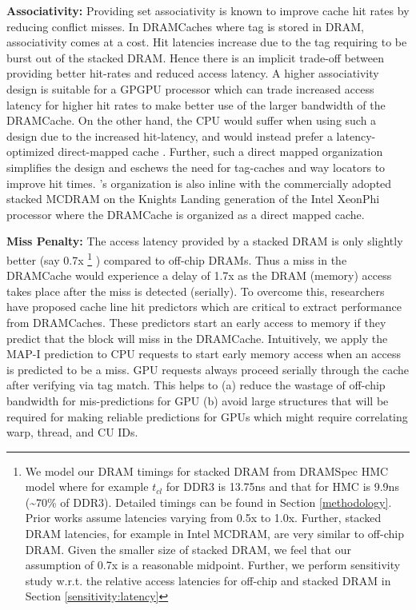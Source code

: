 \par \textbf{Associativity:} Providing set associativity is known to improve cache hit rates by reducing conflict misses. In DRAMCaches where tag is stored in DRAM,  associativity comes at a cost. Hit latencies increase due to the tag requiring to be burst out of the stacked DRAM. Hence there is an implicit trade-off between providing better hit-rates and reduced access latency. A higher associativity design is suitable for a GPGPU processor which can trade increased access latency for higher hit rates to make better use of the larger bandwidth of the DRAMCache. On the other hand, the CPU would suffer when using such a design due to the increased hit-latency, and  would instead prefer a latency-optimized direct-mapped cache \cite{alloy}.
Further, such a direct mapped organization simplifies the design and eschews the need for tag-caches \cite{atcache} and way locators \cite{bimodal} to improve hit times. \cachename's organization is also inline with the commercially adopted stacked MCDRAM on the Knights Landing generation of the Intel XeonPhi processor \cite{xeonphi} where the DRAMCache is organized as a direct mapped cache.

\par \textbf{Miss Penalty:} The access latency provided by a stacked DRAM is only slightly better (say 0.7x
\footnote{We model our DRAM timings for stacked DRAM from DRAMSpec\cite{dramspec} HMC model where for example $t_{cl}$ for DDR3 is 13.75ns and that for HMC is 9.9ns (\textasciitilde70\% of DDR3). Detailed timings can be found in Section \ref{methodology}. Prior works assume latencies varying from 0.5x\cite{alloy} to 1.0x\cite{mainak-hpca}. Further, stacked DRAM latencies, for example in Intel MCDRAM\cite{xeonphi}, are very similar to off-chip DRAM. Given the smaller size of stacked DRAM, we feel that our assumption of 0.7x is a reasonable midpoint.  Further, we perform sensitivity study w.r.t. the relative access latencies for off-chip and stacked DRAM in Section \ref{sensitivity:latency}}
) compared to off-chip DRAMs. Thus a miss in the DRAMCache would experience a delay of 1.7x as the DRAM (memory) access takes place after the miss is detected (serially). To overcome this, researchers have proposed cache line hit predictors \cite{loh-hill,alloy} which are critical to extract performance from DRAMCaches. These predictors start an early access to memory if they predict that the block will miss in the DRAMCache. Intuitively, we apply the MAP-I prediction \cite{alloy} to CPU requests to start early memory access when an access is predicted to be a miss. GPU requests always proceed serially through the cache after verifying via tag match. This helps to (a) reduce the wastage of off-chip bandwidth for mis-predictions for GPU (b) avoid large structures that will be required for making reliable predictions for GPUs which might require correlating warp, thread, and CU IDs.

